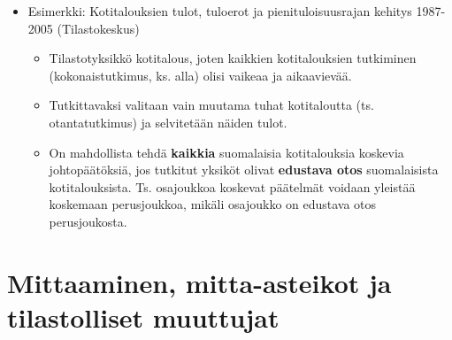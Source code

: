 \documentclass[
]{book}
\providecommand{\tightlist}{%
  \setlength{\itemsep}{0pt}\setlength{\parskip}{0pt}}
\begin{document}
\begin{itemize}
  \begin{itemize}
  \tightlist
  \item
    Esimerkki: Kotitalouksien tulot, tuloerot ja pienituloisuusrajan kehitys 1987-2005 (Tilastokeskus)

    \begin{itemize}
    \tightlist
    \item
      Tilastotyksikkö kotitalous, joten kaikkien kotitalouksien tutkiminen (kokonaistutkimus, ks. alla) olisi vaikeaa ja aikaavievää.
    \item
      Tutkittavaksi valitaan vain muutama tuhat kotitaloutta (ts. otantatutkimus) ja selvitetään näiden tulot.
    \item
      On mahdollista tehdä \textbf{kaikkia} suomalaisia kotitalouksia koskevia johtopäätöksiä, jos tutkitut yksiköt olivat \textbf{edustava otos} suomalaisista kotitalouksista. Ts. osajoukkoa koskevat päätelmät voidaan yleistää koskemaan perusjoukkoa, mikäli osajoukko on edustava otos perusjoukosta.
    \end{itemize}
  \end{itemize}
\end{itemize}

\hypertarget{alaluku53}{%
\section{Mittaaminen, mitta-asteikot ja tilastolliset muuttujat}\label{alaluku53}}
\end{document}
